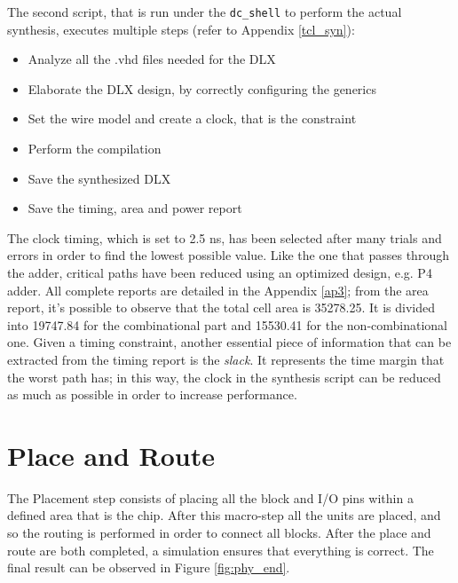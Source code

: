 The second script, that is run under the \texttt{dc\_shell} to perform the actual synthesis, executes multiple steps (refer to Appendix \ref{tcl_syn}):
\begin{itemize}
    \itemsep0sp
    \item Analyze all the .vhd files needed for the DLX
    \item Elaborate the DLX design, by correctly configuring the generics
    \item Set the wire model and create a clock, that is the constraint
    \item Perform the compilation
    \item Save the synthesized DLX
    \item Save the timing, area and power report 
\end{itemize}
The clock timing, which is set to 2.5 ns, has been selected after many trials and errors in order to find the lowest possible value. Like the one that passes through the adder, critical paths have been reduced using an optimized design, e.g. P4 adder.\newline\newline
All complete reports are detailed in the Appendix \ref{ap3}; from the area report, it's possible to observe that the total cell area is 35278.25. It is divided into 19747.84 for the combinational part and 15530.41 for the non-combinational one.\newline\newline
Given a timing constraint, another essential piece of information that can be extracted from the timing report is the \textit{slack}. It represents the time margin that the worst path has; in this way, the clock in the synthesis script can be reduced as much as possible in order to increase performance.

\section{Place and Route}
The Placement step consists of placing all the block and I/O pins within a defined area that is the chip. After this macro-step all the units are placed, and so the routing is performed in order to connect all blocks. After the place and route are both completed, a simulation ensures that everything is correct. The final result can be observed in Figure \ref{fig:phy_end}.


